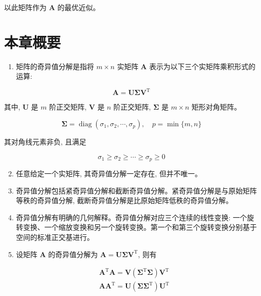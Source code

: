 \documentclass[10pt]{article}
\begin{document}
以此矩阵作为 $\boldsymbol{A}$ 的最优近似。

\section*{本章概要}
\begin{enumerate}
  \item 矩阵的奇异值分解是指将 $m \times n$ 实矩阵 $\boldsymbol{A}$ 表示为以下三个实矩阵乘积形式的运算:
\end{enumerate}

$$
\boldsymbol{A}=\boldsymbol{U} \boldsymbol{\Sigma} \boldsymbol{V}^{\mathrm{T}}
$$

其中, $\boldsymbol{U}$ 是 $m$ 阶正交矩阵, $\boldsymbol{V}$ 是 $n$ 阶正交矩阵, $\boldsymbol{\Sigma}$ 是 $m \times n$ 矩形对角矩阵。

$$
\boldsymbol{\Sigma}=\operatorname{diag}\left(\sigma_{1}, \sigma_{2}, \cdots, \sigma_{p}\right), \quad p=\min \{m, n\}
$$

其对角线元素非负, 且满足

$$
\sigma_{1} \geqslant \sigma_{2} \geqslant \cdots \geqslant \sigma_{p} \geqslant 0
$$

\begin{enumerate}
  \setcounter{enumi}{1}
  \item 任意给定一个实矩阵, 其奇异值分解一定存在, 但并不唯一。

  \item 奇异值分解包括紧奇异值分解和截断奇异值分解。紧奇异值分解是与原始矩阵等秩的奇异值分解, 截断奇异值分解是比原始矩阵低秩的奇异值分解。

  \item 奇异值分解有明确的几何解释。奇异值分解对应三个连续的线性变换: 一个旋转变换、一个缩放变换和另一个旋转变换。第一个和第三个旋转变换分别基于空间的标准正交基进行。

  \item 设矩阵 $\boldsymbol{A}$ 的奇异值分解为 $\boldsymbol{A}=\boldsymbol{U} \boldsymbol{\Sigma} \boldsymbol{V}^{\mathrm{T}}$, 则有

\end{enumerate}

$$
\begin{aligned}
& \boldsymbol{A}^{\mathrm{T}} \boldsymbol{A}=\boldsymbol{V}\left(\boldsymbol{\Sigma}^{\mathrm{T}} \boldsymbol{\Sigma}\right) \boldsymbol{V}^{\mathrm{T}} \\
& \boldsymbol{A} \boldsymbol{A}^{\mathrm{T}}=\boldsymbol{U}\left(\boldsymbol{\Sigma} \boldsymbol{\Sigma}^{\mathrm{T}}\right) \boldsymbol{U}^{\mathrm{T}}
\end{aligned}
$$
\end{document}

